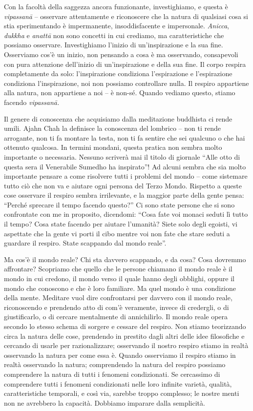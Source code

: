 Con la facoltà della saggezza ancora funzionante, investighiamo, e
questa è \emph{vipassanā} -- osservare attentamente e riconoscere che la
natura di qualsiasi cosa si stia sperimentando è impermanente,
insoddisfacente e impersonale. \emph{Anicca}, \emph{dukkha} e
\emph{anattā} non sono concetti in cui crediamo, ma caratteristiche che
possiamo osservare. Investighiamo l'inizio di un'inspirazione e la sua
fine. Osserviamo cos'è un inizio, non pensando a cosa è ma osservando,
consapevoli con pura attenzione dell'inizio di un'inspirazione e della
sua fine. Il corpo respira completamente da solo: l'inspirazione
condiziona l'espirazione e l'espirazione condiziona l'inspirazione, noi
non possiamo controllare nulla. Il respiro appartiene alla natura, non
appartiene a noi -- è non-sé. Quando vediamo questo, stiamo facendo
\emph{vipassanā. }

Il genere di conoscenza che acquisiamo dalla meditazione buddhista ci
rende umili. Ajahn Chah la definisce la conoscenza del lombrico -- non
ti rende arrogante, non ti fa montare la testa, non ti fa sentire che
sei qualcuno o che hai ottenuto qualcosa. In termini mondani, questa
pratica non sembra molto importante o necessaria. Nessuno scriverà mai
il titolo di giornale ``Alle otto di questa sera il Venerabile Sumedho
ha inspirato''! Ad alcuni sembra che sia molto importante pensare a come
risolvere tutti i problemi del mondo -- come sistemare tutto ciò che non
va e aiutare ogni persona del Terzo Mondo. Rispetto a queste cose
osservare il respiro sembra irrilevante, e la maggior parte della gente
pensa: ``Perché sprecare il tempo facendo questo?'' Ci sono state
persone che si sono confrontate con me in proposito, dicendomi: ``Cosa
fate voi monaci seduti lì tutto il tempo? Cosa state facendo per aiutare
l'umanità? Siete solo degli egoisti, vi aspettate che la gente vi porti
il cibo mentre voi non fate che stare seduti a guardare il respiro.
State scappando dal mondo reale''.

Ma cos'è il mondo reale? Chi sta davvero scappando, e da cosa? Cosa
dovremmo affrontare? Scopriamo che quello che le persone chiamano il
mondo reale è il mondo in cui credono, il mondo verso il quale hanno
degli obblighi, oppure il mondo che conoscono e che è loro familiare. Ma
quel mondo è una condizione della mente. Meditare vuol dire confrontarsi
per davvero con il mondo reale, riconoscendo e prendendo atto di com'è
veramente, invece di credergli, o di giustificarlo, o di cercare
mentalmente di annichilirlo. Il mondo reale opera secondo lo stesso
schema di sorgere e cessare del respiro. Non stiamo teorizzando circa la
natura delle cose, prendendo in prestito dagli altri delle idee
filosofiche e cercando di usarle per razionalizzare; osservando il
nostro respiro stiamo in realtà osservando la natura per come essa è.
Quando osserviamo il respiro stiamo in realtà osservando la natura;
comprendendo la natura del respiro possiamo comprendere la natura di
tutti i fenomeni condizionati. Se cercassimo di comprendere tutti i
fenomeni condizionati nelle loro infinite varietà, qualità,
caratteristiche temporali, e così via, sarebbe troppo complesso; le
nostre menti non ne avrebbero la capacità. Dobbiamo imparare dalla
semplicità.

